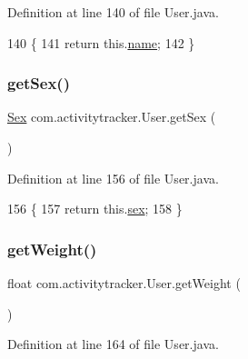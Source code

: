 Definition at line 140 of file User.\+java.


\begin{DoxyCode}
140                             \{
141         \textcolor{keywordflow}{return} this.\mbox{\hyperlink{classcom_1_1activitytracker_1_1_user_a49bfb4c8ebf8b7a377df01b5f0b2d7bc}{name}};
142     \}
\end{DoxyCode}
\mbox{\label{classcom_1_1activitytracker_1_1_user_ac184fdb794730df3fedf3b147283a5fd}} 
\subsubsection{\texorpdfstring{get\+Sex()}{getSex()}}
{\footnotesize\ttfamily \mbox{\hyperlink{enumcom_1_1activitytracker_1_1_user_1_1_sex}{Sex}} com.\+activitytracker.\+User.\+get\+Sex (\begin{DoxyParamCaption}{ }\end{DoxyParamCaption})}



Definition at line 156 of file User.\+java.


\begin{DoxyCode}
156                         \{
157         \textcolor{keywordflow}{return} this.\mbox{\hyperlink{classcom_1_1activitytracker_1_1_user_adcbddd2e965af4e227f7cf0582a3e13d}{sex}};
158     \}
\end{DoxyCode}
\mbox{\label{classcom_1_1activitytracker_1_1_user_ad15d7b4f96adb6d1a14054bf3eb7e4e0}} 
\subsubsection{\texorpdfstring{get\+Weight()}{getWeight()}}
{\footnotesize\ttfamily float com.\+activitytracker.\+User.\+get\+Weight (\begin{DoxyParamCaption}{ }\end{DoxyParamCaption})}



Definition at line 164 of file User.\+java.


